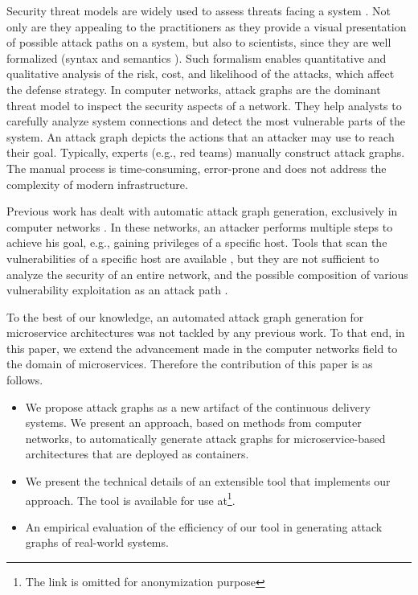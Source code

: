 Security threat models are widely used to assess threats facing a system \cite{kordy2014dag}. Not only are they appealing to the practitioners as they provide a visual presentation of possible attack paths on a system, but also to scientists, since they are well formalized (syntax and semantics \cite{mauw2005foundations,jha2002two}). Such formalism enables quantitative and qualitative analysis of the risk, cost, and likelihood of the attacks, which affect the defense strategy. In computer networks, attack graphs \cite{sheyner2002automated,ou2006scalable} are the dominant threat model to inspect the security aspects of a network. They help analysts to carefully analyze system connections and detect the most vulnerable parts of the system. An attack graph depicts the actions that an attacker may use to reach their goal. Typically, experts (e.g., red teams) manually construct attack graphs. The manual process is time-consuming, error-prone and does not address the complexity of modern infrastructure.  %


Previous work has dealt with automatic attack graph generation, exclusively in computer networks \cite{ingols2006practical, sheyner2002automated, ou2006scalable}. In these networks, an attacker performs multiple steps to achieve his goal, e.g., gaining privileges of a specific host. Tools that scan the vulnerabilities of a specific host are available \cite{farmer1990cops}, but they are not sufficient to analyze the security of an entire network, and the possible composition of various vulnerability exploitation as an attack path \cite{sheyner2002automated}. 

To the best of our knowledge, an automated attack graph generation for microservice architectures was not tackled by any previous work. To that end, in this paper, we extend the advancement made in the computer networks field to the domain of microservices. Therefore the contribution of this paper is as follows.
\begin{itemize}
	\item We propose attack graphs as a new artifact of the continuous delivery systems. We present an approach, based on methods from computer networks, to automatically generate attack graphs for microservice-based architectures that are deployed as containers.   
	\item We present the technical details of an extensible tool that implements our approach. The tool is available for use at\footnote{The link is omitted for anonymization  purpose}.
	\item An empirical evaluation of the efficiency of our tool in generating attack graphs of real-world systems.
\end{itemize}




